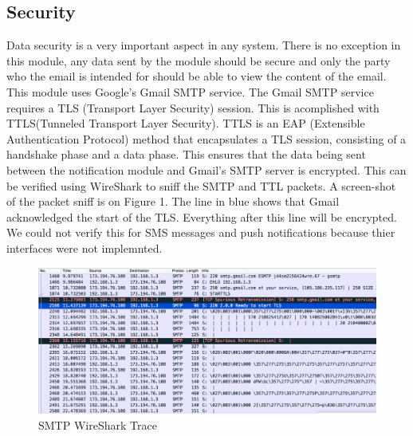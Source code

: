 \documentclass[11pt]{article}
\begin{document}
    \subsection{Security}
    Data security is a very important aspect in any system. There is no exception in this module, any data sent by the module should be secure and only the party who the email is intended for should be able to view the content of the email. This module uses Google's Gmail SMTP service. The Gmail SMTP service requires a TLS (Transport Layer Security) session. This is acomplished with TTLS(Tunneled Transport Layer Security). TTLS is an EAP (Extensible Authentication Protocol) method that encapsulates a TLS session, consisting of a handshake phase and a data phase. This ensures that the data being sent between the notification module and Gmail's SMTP server is encrypted. This can be verified using WireShark to sniff the SMTP and TTL packets. A screen-shot of the packet sniff is on Figure 1. The line in blue shows that Gmail acknowledged the start of the TLS. Everything after this line will be encrypted. We could not verify this for SMS messages and push notifications because thier interfaces were not implemnted.
        \begin{figure}[h!]
          \caption{SMTP WireShark Trace}
          \includegraphics[width=\textwidth]{smtp.jpeg}
        \end{figure}
\end{document}
